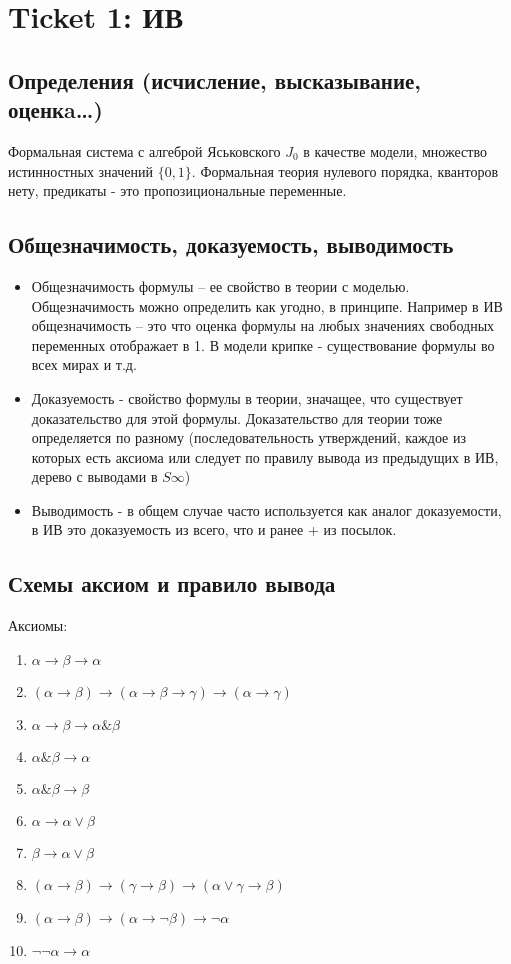 \section{Ticket 1: ИВ}
\label{sec-3}
\subsection{Определения (исчисление, высказывание, оценкa\ldots{})}
\label{sec-3-1}
Формальная система с алгеброй Яськовского $J_{0}$ в качестве модели, множество
истинностных значений $\lbrace 0, 1 \rbrace$. Формальная теория нулевого порядка, кванторов
нету, предикаты - это пропозициональные переменные.
\subsection{Общезначимость, доказуемость, выводимость}
\label{sec-3-2}
\begin{itemize}
\item Общезначимость формулы -- ее свойство в теории с моделью. Общезначимость
можно определить как угодно, в принципе. Например в ИВ общезначимость --
это что оценка формулы на любых значениях свободных переменных отображает
в 1. В модели крипке - существование формулы во всех мирах и т.д.
\item Доказуемость - свойство формулы в теории, значащее, что существует
доказательство для этой формулы. Доказательство для теории тоже определяется
по разному (последовательность утверждений, каждое из которых есть аксиома
или следует по правилу вывода из предыдущих в ИВ, дерево с выводами в $S\infty$)
\item Выводимость - в общем случае часто используется как аналог доказуемости,
в ИВ это доказуемость из всего, что и ранее + из посылок.
\end{itemize}
\subsection{Схемы аксиом и правило вывода}
\label{sec-3-3}
Аксиомы:
\begin{enumerate}
\item $\alpha \to \beta \to \alpha$
\item $(\alpha \to \beta) \to (\alpha \to \beta \to \gamma) \to (\alpha \to \gamma)$
\item $\alpha \to \beta \to \alpha \& \beta$
\item $\alpha \& \beta \to \alpha$
\item $\alpha \& \beta \to \beta$
\item $\alpha \to \alpha \lor \beta$
\item $\beta \to \alpha \lor \beta$
\item $(\alpha \to \beta) \to (\gamma \to \beta) \to (\alpha \lor \gamma \to \beta)$
\item $(\alpha \to \beta) \to (\alpha \to \lnot \beta) \to \lnot \alpha$
\item $\lnot \lnot \alpha \to \alpha$
\end{enumerate}

